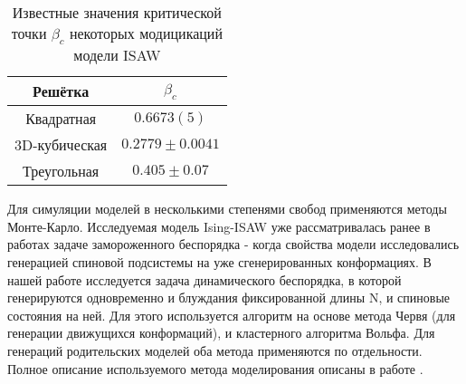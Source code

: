 \begin{table}[h]
    \centering
    \begin{tabular}{|c|c|}
        \hline
        Решётка & $\beta_{c}$ \\ \hline
        Квадратная & $0.6673(5)$ \cite{caracciolo2011geometrical} \\ \hline
        3D-кубическая & $0.2779 \pm 0.0041$\cite{Tesi1996} \\ \hline
        Треугольная & $ 0.405 \pm 0.07$\cite{Privman1986} \\ \hline
    \end{tabular}
    \caption{Известные значения критической точки $\beta_c$ некоторых модицикаций модели ISAW}
    \label{tab:ISAW_T_c}
\end{table}

Для симуляции моделей в несколькими степенями свобод применяются методы Монте-Карло.
Исследуемая модель Ising-ISAW уже рассматривалась ранее в работах \cite{Garel1999, Papale2018} задаче замороженного беспорядка - когда свойства модели исследовались генерацией спиновой подсистемы на уже сгенерированных конформациях.
В нашей работе исследуется задача динамического беспорядка, в которой генерируются одновременно и блуждания фиксированной длины N, и спиновые состояния на ней.
Для этого используется алгоритм на основе метода Червя (для генерации движущихся конформаций), и кластерного алгоритма Вольфа. 
Для генераций родительских моделей оба метода применяются по отдельности.
Полное описание используемого метода моделирования описаны в работе \cite{faizullina2021critical}.
